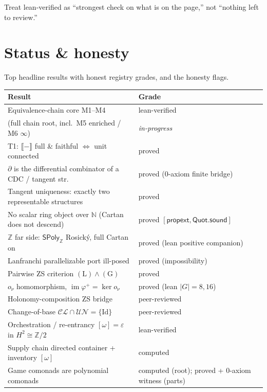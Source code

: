 \documentclass[11pt]{article}
\theoremstyle{definition}
\newcommand{\SPoly}{\mathsf{SPoly}}
\newcommand{\N}{\mathbb{N}}
\newcommand{\Z}{\mathbb{Z}}
\newcommand{\sem}[1]{\llbracket #1 \rrbracket}
\newcommand{\onu}{o_{\nu}}
\begin{document}
\noindent Treat \textsf{lean-verified} as ``strongest check on what is on the page,'' not
``nothing left to review.''

\section{Status \& honesty}
\label{sec:status}

Top headline results with honest registry grades, and the honesty flags.

\begin{center}
\small
\begin{longtable}{p{} l}
\toprule
\textbf{Result} & \textbf{Grade} \\
\midrule
\endhead
Equivalence-chain core M1--M4 & lean-verified \\
\quad(full chain root, incl.\ M5 enriched / M6 $\infty$) & \emph{in-progress} \\
T1: $\sem{-}$ full \& faithful $\Leftrightarrow$ unit connected & proved \\
$\partial$ is the differential combinator of a CDC / tangent str. & proved (0-axiom finite bridge) \\
Tangent uniqueness: exactly two representable structures & proved \\
No scalar ring object over $\N$ (Cartan does not descend) & proved $[\textsf{propext},\textsf{Quot.sound}]$ \\
$\Z$ far side: $\SPoly_\Z$ Rosický, full Cartan on & proved (lean positive companion) \\
Lanfranchi parallelizable port ill-posed & proved (impossibility) \\
Pairwise ZS criterion $(\mathrm{L})\wedge(\mathrm{G})$ & proved \\
$\onu$ homomorphism, $\operatorname{im}\varphi^+=\ker\onu$ & proved (lean $|G|=8,16$) \\
Holonomy-composition ZS bridge & peer-reviewed \\
Change-of-base $\mathcal{CL}\cap\mathcal{UN}=\{\mathrm{Id}\}$ & peer-reviewed \\
Orchestration / re-entrancy $[\omega]=\varepsilon$ in $H^2\cong\Z/2$ & lean-verified \\
Supply chain directed container + inventory $[\omega]$ & computed \\
Game comonads are polynomial comonads & computed (root); proved + 0-axiom witness (parts) \\
\bottomrule
\end{longtable}
\end{center}
\end{document}
